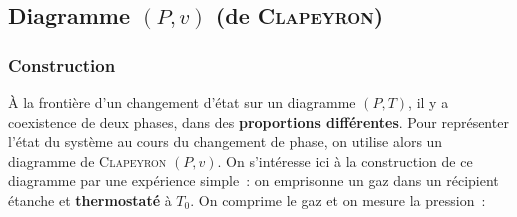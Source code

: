 \documentclass[../../main/main.tex]{subfiles}
\begin{document}
\subsection{Diagramme $(P,v)$ (de \textsc{Clapeyron})}
\subsubsection{Construction}
À la frontière d’un changement d’état sur un diagramme $(P,T)$, il y a
coexistence de deux phases, dans des \textbf{proportions différentes}. Pour
représenter l’état du système au cours du changement de phase, on utilise alors
un diagramme de \textsc{Clapeyron} $(P,v)$.
\smallbreak
On s'intéresse ici à la construction de ce diagramme par une expérience simple~:
on emprisonne un gaz dans un récipient étanche et \textbf{thermostaté} à $T_0$.
On comprime le gaz et on mesure la pression~:
\bigbreak
\noindent
\end{document}
